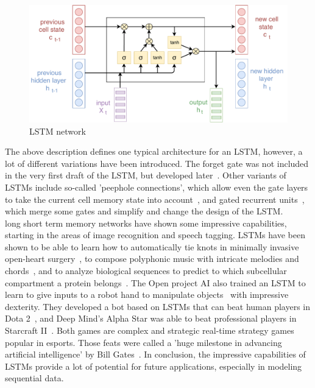 \documentclass[
a4paper,
pagesize,
pdftex,
12pt,
ngerman,
fleqn,
final,
]{scrartcl}
\begin{document}
	\begin{figure}[ht]
		\centering
		\includegraphics[width=\linewidth]{img/LSTM}
		\caption{LSTM network}
		\label{fig:architectureLSTM}
	\end{figure}
	
	The above description defines one typical architecture for an LSTM, however, a lot of different variations have been introduced. The forget gate was not included in the very first draft of the LSTM, but developed later~\cite{Gers.1999}. Other variants of LSTMs include so-called 'peephole connections', which allow even the gate layers to take the current cell memory state into account~\cite{Gers.2000}, and gated recurrent units~\cite{Cho.2014}, which merge some gates and simplify and change the design of the LSTM. \\
	long short term memory networks have shown some impressive capabilities, starting in the areas of image recognition and speech tagging. LSTMs have been shown to be able to learn how to automatically tie knots in minimally invasive open-heart surgery~\cite{Mayer.2008}, to compose polyphonic music with intricate melodies and chords~\cite{Kumar.2019}, and to analyze biological sequences to predict to which subcellular compartment a protein belongs~\cite{Snderby.2015}. The Open project AI also trained an LSTM to learn to give inputs to a robot hand to manipulate objects~\cite{OpenAIBlog.2018} with impressive dexterity. They developed a bot based on LSTMs that can beat human players in Dota 2~\cite{Rodriguez.2018}, and Deep Mind's Alpha Star was able to beat professional players in Starcraft II~\cite{Stanford.2019}. Both games are complex and strategic real-time strategy games popular in esports. Those feats were called a 'huge milestone in advancing artificial intelligence' by Bill Gates~\cite{Gates2019}. In conclusion, the impressive capabilities of LSTMs provide a lot of potential for future applications, especially in modeling sequential data.
	
\end{document}
